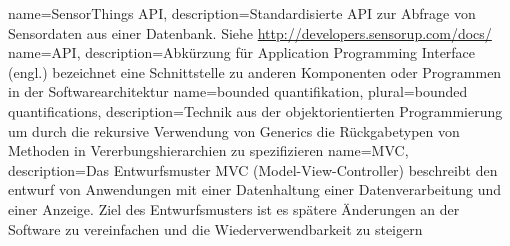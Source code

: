 \makenoidxglossaries
{}
{
	name=SensorThings \gls{API},
	description={Standardisierte \gls{API} zur Abfrage von Sensordaten aus einer Datenbank. Siehe \url{http://developers.sensorup.com/docs/}}
}
{
	name=API,
	description={Abkürzung für Application Programming Interface (engl.) bezeichnet eine Schnittstelle zu anderen Komponenten oder Programmen in der Softwarearchitektur}
}
{
    name=bounded quantifikation,
    plural=bounded quantifications,
    description={Technik aus der objektorientierten Programmierung um durch die rekursive Verwendung von Generics die Rückgabetypen von Methoden in Vererbungshierarchien zu spezifizieren}
}
{
	name=MVC,
	description={Das Entwurfsmuster MVC (Model-View-Controller) beschreibt den entwurf von Anwendungen mit einer Datenhaltung einer Datenverarbeitung und einer Anzeige. Ziel des Entwurfsmusters ist es spätere Änderungen an der Software zu vereinfachen und die Wiederverwendbarkeit zu steigern}
}